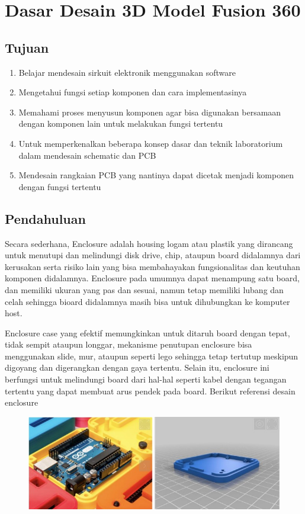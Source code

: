 \chapter{Dasar Desain 3D Model Fusion 360}

\section{Tujuan}
\begin{enumerate}
    \item Belajar mendesain sirkuit elektronik menggunakan software
    \item Mengetahui fungsi setiap komponen dan cara implementasinya
    \item Memahami proses menyusun komponen agar bisa digunakan bersamaan dengan komponen lain
    untuk melakukan fungsi tertentu
    \item Untuk memperkenalkan beberapa konsep dasar dan teknik laboratorium dalam mendesain
    schematic dan PCB
    \item Mendesain rangkaian PCB yang nantinya dapat dicetak menjadi komponen dengan fungsi
    tertentu
\end{enumerate}

\section{Pendahuluan}
Secara sederhana, Enclosure adalah housing logam atau plastik yang dirancang untuk menutupi dan
melindungi disk drive, chip, ataupun board didalamnya dari kerusakan serta risiko lain yang bisa
membahayakan fungsionalitas dan keutuhan komponen didalamnya. Enclosure pada umumnya dapat
menampung satu board, dan memiliki ukuran yang pas dan sesuai, namun tetap memiliki lubang dan celah
sehingga bioard didalamnya masih bisa untuk dihubungkan ke komputer host.

Enclosure case yang efektif memungkinkan untuk ditaruh board dengan tepat, tidak sempit ataupun
longgar, mekanisme penutupan enclosure bisa menggunakan slide, mur, ataupun seperti lego sehingga
tetap tertutup meskipun digoyang dan digerangkan dengan gaya tertentu. Selain itu, enclosure ini
berfungsi untuk melindungi board dari hal-hal seperti kabel dengan tegangan tertentu yang dapat
membuat arus pendek pada board. Berikut referensi desain enclosure

    \begin{figure}[H]
        \centering
        \includegraphics[width=1\linewidth]{P3/img/image1.jpg}
        
    \end{figure}


